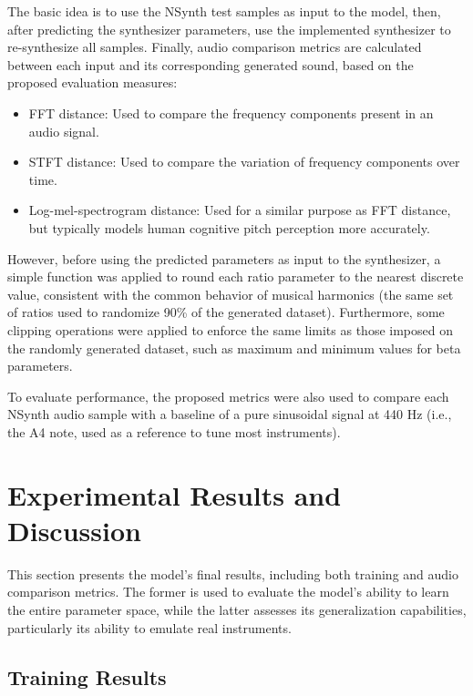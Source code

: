 \documentclass[10pt,conference]{IEEEtran}
\begin{document}
The basic idea is to use the NSynth test samples as input to the model, then, after predicting the synthesizer parameters, use the implemented synthesizer to re-synthesize all samples. Finally, audio comparison metrics are calculated between each input and its corresponding generated sound, based on the proposed evaluation measures:

\begin{itemize}
    \item FFT distance: Used to compare the frequency components present in an audio signal.
    \item STFT distance: Used to compare the variation of frequency components over time.
    \item Log-mel-spectrogram distance: Used for a similar purpose as FFT distance, but typically models human cognitive pitch perception more accurately.
\end{itemize}

However, before using the predicted parameters as input to the synthesizer, a simple function was applied to round each ratio parameter to the nearest discrete value, consistent with the common behavior of musical harmonics (the same set of ratios used to randomize 90\% of the generated dataset). Furthermore, some clipping operations were applied to enforce the same limits as those imposed on the randomly generated dataset, such as maximum and minimum values for beta parameters.

To evaluate performance, the proposed metrics were also used to compare each NSynth audio sample with a baseline of a pure sinusoidal signal at 440 Hz (i.e., the A4 note, used as a reference to tune most instruments).

\section{Experimental Results and Discussion}  \label{sec:experiments}

This section presents the model's final results, including both training and audio comparison metrics. The former is used to evaluate the model’s ability to learn the entire parameter space, while the latter assesses its generalization capabilities, particularly its ability to emulate real instruments.

\subsection{Training Results}
\end{document}

